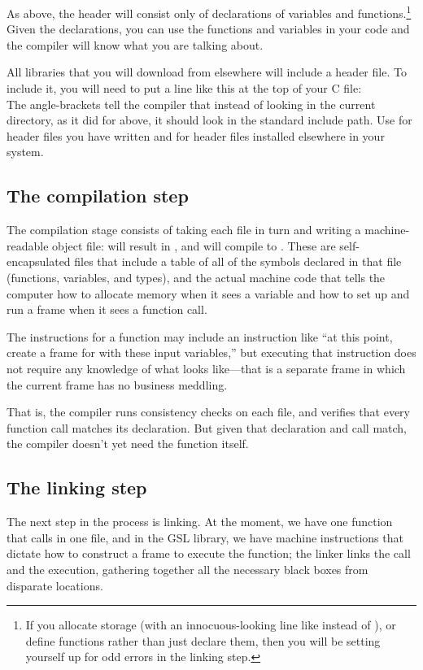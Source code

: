 \documentclass[12pt]{article}
\def\ind#1{\index{#1}#1}
\begin{document}
As above, the header will consist only of declarations of variables
and functions.\footnote{If you allocate storage (with an innocuous-looking
line like  instead of ), or define
functions rather than just declare them, then you will be setting
yourself up for odd errors in the linking step.} Given the declarations,
you can use the functions and variables in your code and the compiler
will know what you are talking about.

All libraries that you will download from elsewhere will include a header file.
To include it, you will need to put a line like this at the top of your C file:
\\
The angle-brackets tell the compiler that instead of looking in the
current directory, as it did for  above, it should
look in the standard include path. Use  for header
files you have written and  for header files
installed elsewhere in your system.  

\subsection{The compilation step} 
The \ind{compilation}
stage consists of taking each  file in turn and
writing a machine-readable object file:  will
result in , and  will compile to
. These  are self-encapsulated
files that include a table of all of the symbols declared in that file
(functions, variables, and types), and 
the actual machine code that tells the computer how to allocate memory
when it sees a variable and how to set up and run a frame when it sees a
function call.

The instructions for a function may include an instruction like ``at this
point, create a frame for  with these input
variables,'' but executing that instruction does not require any knowledge
of what  looks like---that is a separate frame
in which the current frame has no business meddling.

That is, the compiler runs consistency checks on each file, and
verifies that every function call matches its declaration.  But given
that declaration and call match, the compiler doesn't yet need the
function itself.

\subsection{The \ind{linking} step}
The next step in the process is linking. At the moment, we have one
function that calls  in one file, and in the
GSL library, we have machine instructions that dictate how to construct
a frame to execute the  function; the linker links
the call and the execution, gathering together all the necessary black
boxes from disparate locations.
\end{document}
